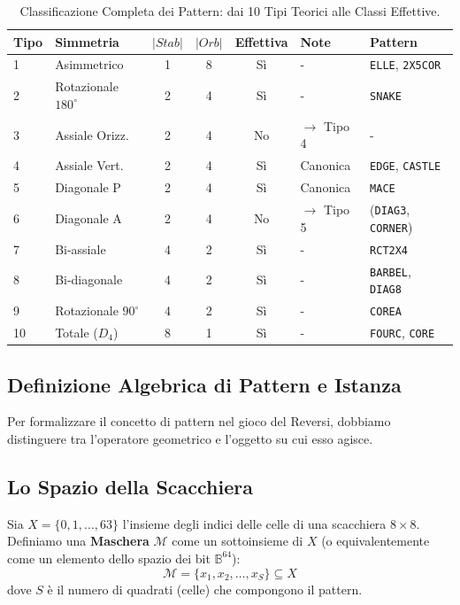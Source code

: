 \begin{table}[h]
\centering
\caption{Classificazione Completa dei Pattern: dai 10 Tipi Teorici alle Classi Effettive.}
\label{tab:pattern_classification}
\begin{tabular}{llcccll}
\hline
\textbf{Tipo} & \textbf{Simmetria} & \textbf{$|Stab|$} & \textbf{$|Orb|$} & \textbf{Effettiva} & \textbf{Note} & \textbf{Pattern} \\ \hline
1 & Asimmetrico & 1 & 8 & Sì & - & \texttt{ELLE}, \texttt{2X5COR} \\
2 & Rotazionale $180^\circ$ & 2 & 4 & Sì & - & \texttt{SNAKE} \\
3 & Assiale Orizz. & 2 & 4 & No & $\to$ Tipo 4 & - \\
4 & Assiale Vert. & 2 & 4 & Sì & Canonica & \texttt{EDGE}, \texttt{CASTLE} \\
5 & Diagonale P & 2 & 4 & Sì & Canonica & \texttt{MACE} \\
6 & Diagonale A & 2 & 4 & No & $\to$ Tipo 5 & (\texttt{DIAG3}, \texttt{CORNER}) \\
7 & Bi-assiale & 4 & 2 & Sì & - & \texttt{RCT2X4} \\
8 & Bi-diagonale & 4 & 2 & Sì & - & \texttt{BARBEL}, \texttt{DIAG8} \\
9 & Rotazionale $90^\circ$ & 4 & 2 & Sì & - & \texttt{COREA} \\
10 & Totale ($D_4$) & 8 & 1 & Sì & - & \texttt{FOURC}, \texttt{CORE} \\
\hline
\end{tabular}
\end{table}

\subsection{Definizione Algebrica di Pattern e Istanza}

Per formalizzare il concetto di pattern nel gioco del Reversi, dobbiamo distinguere tra l'operatore geometrico e l'oggetto su cui esso agisce.

\subsection{Lo Spazio della Scacchiera}
Sia $X = \{0, 1, \dots, 63\}$ l'insieme degli indici delle celle di una scacchiera $8 \times 8$. Definiamo una \textbf{Maschera} $\mathcal{M}$ come un sottoinsieme di $X$ (o equivalentemente come un elemento dello spazio dei bit $\mathbb{B}^{64}$):
\begin{equation}
    \mathcal{M} = \{x_1, x_2, \dots, x_S\} \subseteq X
\end{equation}
dove $S$ è il numero di quadrati (celle) che compongono il pattern.

